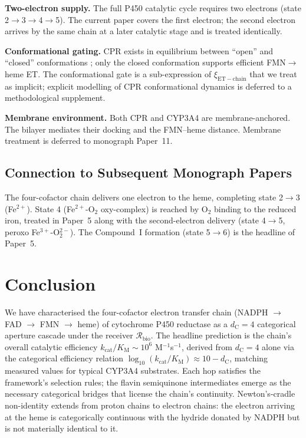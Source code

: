 \documentclass[11pt,twocolumn,a4paper]{article}
\theoremstyle{definition}
\theoremstyle{remark}
\newcommand{\Recv}{\mathcal{R}}
\newcommand{\Sexp}{\xi}
\newcommand{\dC}{d_{\mathrm{C}}}
\newcommand{\kcat}{k_{\mathrm{cat}}}
\newcommand{\KM}{K_{\mathrm{M}}}
\begin{document}
\textbf{Two-electron supply.} The full P450 catalytic cycle requires two
electrons (state 2$\to$3$\to$4$\to$5). The current paper covers the first
electron; the second electron arrives by the same chain at a later
catalytic stage and is treated identically.

\textbf{Conformational gating.} CPR exists in equilibrium between
``open'' and ``closed'' conformations \citep{ellis2009}; only the closed
conformation supports efficient FMN$\to$heme ET. The conformational gate
is a sub-expression of $\Sexp_{\mathrm{ET-chain}}$ that we treat as
implicit; explicit modelling of CPR conformational dynamics is deferred
to a methodological supplement.

\textbf{Membrane environment.} Both CPR and CYP3A4 are membrane-anchored.
The bilayer mediates their docking and the FMN--heme distance. Membrane
treatment is deferred to monograph Paper~11.

\subsection{Connection to Subsequent Monograph Papers}

The four-cofactor chain delivers one electron to the heme, completing
state 2$\to$3 (Fe$^{2+}$). State 4 (Fe$^{2+}$-O$_2$ oxy-complex) is
reached by O$_2$ binding to the reduced iron, treated in Paper~5
\citep{sachikonye2025_paper5_planned} along with the second-electron
delivery (state 4$\to$5, peroxo Fe$^{3+}$-O$_2^{2-}$). The Compound~I
formation (state 5$\to$6) is the headline of Paper~5.

\section{Conclusion}
\label{sec:conclusion}

We have characterised the four-cofactor electron transfer chain
(NADPH $\to$ FAD $\to$ FMN $\to$ heme) of cytochrome P450 reductase as
a $\dC = 4$ categorical aperture cascade under the receiver
$\Recv_{\mathrm{bio}}$. The headline prediction is the chain's overall
catalytic efficiency $\kcat/\KM \sim 10^6$ M$^{-1}$s$^{-1}$, derived from
$\dC = 4$ alone via the categorical efficiency relation
$\log_{10}(\kcat/\KM) \approx 10 - \dC$, matching measured values for
typical CYP3A4 substrates. Each hop satisfies the framework's selection
rules; the flavin semiquinone intermediates emerge as the necessary
categorical bridges that license the chain's continuity. Newton's-cradle
non-identity extends from proton chains to electron chains: the electron
arriving at the heme is categorically continuous with the hydride donated
by NADPH but is not materially identical to it.
\end{document}
